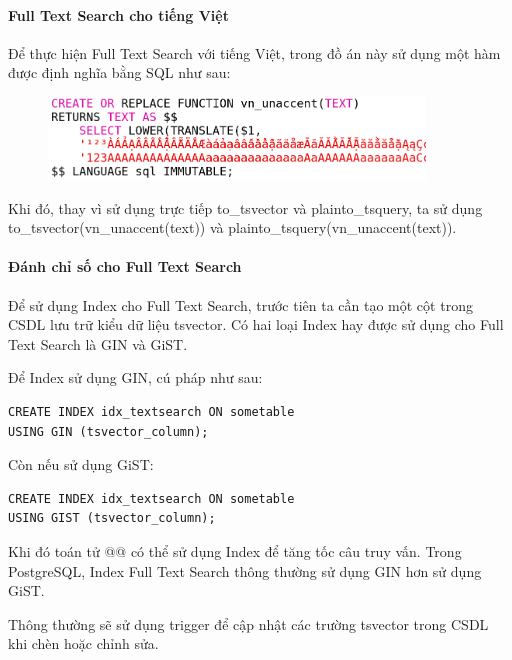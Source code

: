 \paragraph{Full Text Search cho tiếng Việt}
Để thực hiện Full Text Search với tiếng Việt,
trong đồ án này sử dụng một hàm được định nghĩa bằng SQL như sau: 
\begin{figure}[H]
\centering
\includegraphics[width=10cm]{images/unaccent.png}
\end{figure}
Khi đó, thay vì sử dụng trực tiếp to\_tsvector và plainto\_tsquery,
ta sử dụng \\
to\_tsvector(vn\_unaccent(text)) và plainto\_tsquery(vn\_unaccent(text)).

\paragraph{Đánh chỉ số cho Full Text Search}
Để sử dụng Index cho Full Text Search, trước tiên ta cần tạo
một cột trong CSDL lưu trữ kiểu dữ liệu tsvector.
Có hai loại Index hay được sử dụng cho Full Text Search là GIN và GiST. 

\noindent Để Index sử dụng GIN, cú pháp như sau:
\begin{lstlisting}[caption={Tạo index sử dụng GIN},captionpos=b]
CREATE INDEX idx_textsearch ON sometable
USING GIN (tsvector_column);
\end{lstlisting}

\noindent Còn nếu sử dụng GiST:
\begin{lstlisting}[caption={Tạo index sử dụng GiST},captionpos=b]
CREATE INDEX idx_textsearch ON sometable
USING GIST (tsvector_column);
\end{lstlisting}

Khi đó toán tử @@ có thể sử dụng Index để
tăng tốc câu truy vấn. Trong PostgreSQL, Index Full Text Search
thông thường sử dụng GIN hơn sử dụng GiST. 

Thông thường sẽ sử dụng trigger để cập nhật các trường
tsvector trong CSDL khi chèn hoặc chỉnh sửa.

